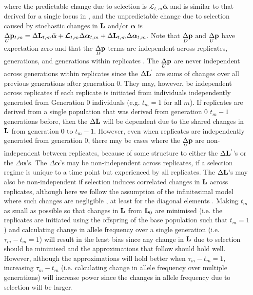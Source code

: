 \documentclass[12pt]{article}
\begin{document}
\begin{bibunit}
where the predictable change due to selection is $\boldsymbol{\mathcal{L}}_{t,m}\bar{\boldsymbol{\alpha}}$ and is similar to that derived for a single locus in \citet{Santiago.1998}, and the unpredictable change due to selection caused by stochastic changes in  ${\bf L}$ and/or $\boldsymbol{\alpha}$ is $\underset{U}\Delta {\bf p}_{t,m}=\Delta{\bf L}_{t,m}\bar{\boldsymbol{\alpha}}+\boldsymbol{\mathcal{L}}_{t,m}\Delta\boldsymbol{\alpha}_{t,m}+\Delta{\bf L}_{t,m}\Delta\boldsymbol{\alpha}_{t,m}$. Note that $\underset{D}\Delta {\bf p}$ and $\underset{U}\Delta {\bf p}$ have expectation zero and that the $\underset{D}\Delta {\bf p}$ terms are independent across replicates, generations, and generations within replicates \citep{buffalo2019linked}. The $\underset{U}\Delta {\bf p}$ are never independent across generations within replicates since the $\Delta {\bf L}^{'}$ are sums of changes over all previous generations after generation 0. They may, however, be independent across replicates if each replicate is initiated from individuals independently generated from Generation $0$ individuals (e.g. $t_m=1$ for all $m$).  If replicates are derived from a single population that was derived from generation 0 $t_m-1$ generations before, then the $\Delta {\bf L}$ will be dependent due to the shared changes in ${\bf L}$ from generation $0$ to $t_m-1$. However, even when replicates are independently generated from generation $0$, there may be cases where the $\underset{U}\Delta {\bf p}$ are non-independent between replicates, because of some structure to either the $\Delta {\bf L}^{'}$'s or the $\Delta\boldsymbol{\alpha}$'s. The $\Delta\boldsymbol{\alpha}$'s may be non-independent across replicates, if a selection regime is unique to a time point but experienced by all replicates. The $\Delta {\bf L}$'s may also be non-independent if selection induces correlated changes in ${\bf L}$ across replicates, although here we follow the assumption of the infinitesimal model where such changes are negligible \citep{Barton.2017}, at least for the diagonal elements \citep{Bulmer.1971}. Making $t_m$ as small as possible so that changes in ${\bf L}$ from ${\bf L}_0$ are minimised (i.e. the replicates are initiated using the offspring of the base population such that $t_m=1$) and calculating change in allele frequency over a single generation (i.e. $\tau_m-t_m=1$) will result in the least bias since any change in ${\bf L}$ due to selection should be minimised and the approximations that follow should hold well.  However, although the approximations will hold better when $\tau_m-t_m=1$, increasing  $\tau_m-t_m$ (i.e. calculating change in allele frequency over multiple generations) will increase power since the changes in allele frequency due to selection will be larger.  


\end{bibunit}
\end{document}
